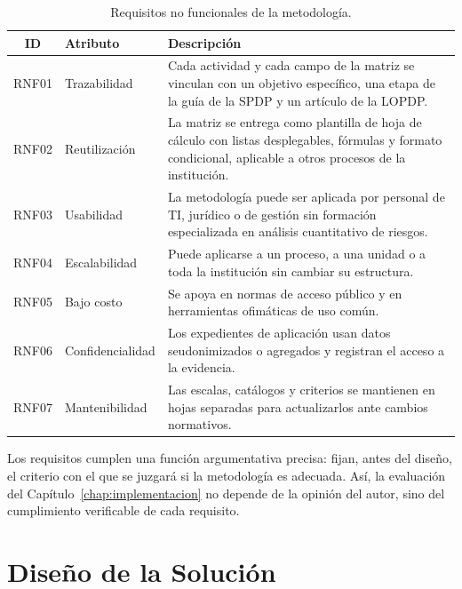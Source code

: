 \begin{table}[htbp]
  \centering
  \caption{Requisitos no funcionales de la metodología.}
  \label{tab:rnf}
  \footnotesize
  \renewcommand{\arraystretch}{1.2}
  \begin{tabularx}{\textwidth}{|c|p{2.8cm}|L|}
    \hline
    \textbf{ID} & \textbf{Atributo} & \textbf{Descripción} \\
    \hline
    RNF01 & Trazabilidad & Cada actividad y cada campo de la matriz se vinculan con un objetivo específico, una etapa de la guía de la SPDP y un artículo de la LOPDP. \\
    \hline
    RNF02 & Reutilización & La matriz se entrega como plantilla de hoja de cálculo con listas desplegables, fórmulas y formato condicional, aplicable a otros procesos de la institución. \\
    \hline
    RNF03 & Usabilidad & La metodología puede ser aplicada por personal de TI, jurídico o de gestión sin formación especializada en análisis cuantitativo de riesgos. \\
    \hline
    RNF04 & Escalabilidad & Puede aplicarse a un proceso, a una unidad o a toda la institución sin cambiar su estructura. \\
    \hline
    RNF05 & Bajo costo & Se apoya en normas de acceso público y en herramientas ofimáticas de uso común. \\
    \hline
    RNF06 & Confidencialidad & Los expedientes de aplicación usan datos seudonimizados o agregados y registran el acceso a la evidencia. \\
    \hline
    RNF07 & Mantenibilidad & Las escalas, catálogos y criterios se mantienen en hojas separadas para actualizarlos ante cambios normativos. \\
    \hline
  \end{tabularx}
  \raggedright
\end{table}

Los requisitos cumplen una función argumentativa precisa: fijan, antes del diseño, el criterio con el que se juzgará si la metodología es adecuada. Así, la evaluación del Capítulo~\ref{chap:implementacion} no depende de la opinión del autor, sino del cumplimiento verificable de cada requisito.

\section{Diseño de la Solución}
\label{sec:diseno_solucion}

